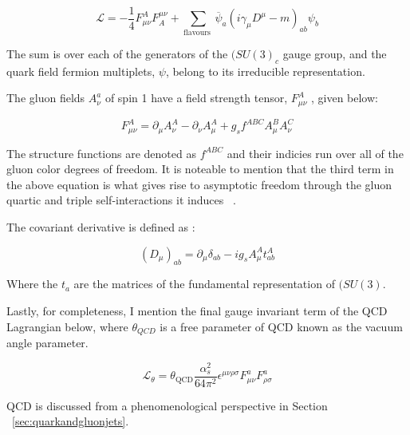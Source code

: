 \begin{equation}
\mathcal{L}=-\frac{1}{4} F_{\mu \nu}^{A} F_{A}^{\mu \nu}+\sum_{\text {flavours }} \overline{\psi}_{a}\left(i \gamma_{\mu} D^{\mu}-m\right)_{a b} \psi_{b}
\end{equation}


The sum is over each of the generators of the $(SU(3)_c$ gauge group, and the quark field fermion multiplets, $\psi$, belong to its irreducible representation.~\cite{Crewther:1995wq}

The gluon fields $A_{\nu}^a$ of spin 1 have a field strength tensor, $F_{\mu \nu}^{A}$ , given below:\newline 

\begin{equation}
F_{\mu \nu}^{A}=\partial_{\mu} A_{\nu}^{A}-\partial_{\nu} A_{\mu}^{A}+g_{s} f^{A B C} A_{\mu}^{B} A_{\nu}^{C}
\end{equation}


The structure functions are denoted as $f^{A B C}$ and their indicies run over all of the gluon color degrees of freedom. It is noteable to mention that the third term in the above equation is what gives rise to asymptotic freedom through the gluon quartic and triple self-interactions it induces ~\cite{Crewther:1995wq}.

The covariant derivative is defined as :\newline

\begin{equation}
\left(D_{\mu}\right)_{a b}=\partial_{\mu} \delta_{a b}-i g_{s} A_{\mu}^{A} t_{a b}^{A}
\end{equation}

Where the $t_{a}$ are the matrices of the fundamental representation of $(SU(3)$.

Lastly, for completeness, I mention the final gauge invariant term of the QCD Lagrangian below, where $\theta_{QCD}$ is a free parameter of QCD known as the vacuum angle parameter.

\begin{equation}
\mathcal{L}_{\theta}=\theta_{\mathrm{QCD}} \frac{\alpha_{s}^{2}}{64 \pi^{2}} \epsilon^{\mu \nu \rho \sigma} F_{\mu \nu}^{a} F_{\rho \sigma}^{a}
\end{equation}


QCD is discussed from a phenomenological perspective in Section ~\ref{sec:quarkandgluonjets}. 













